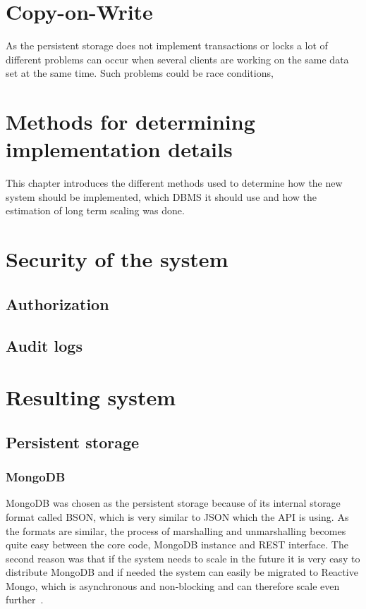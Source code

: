 \documentclass[a4paper,12pt]{article}
\begin{document}
\newpage 
\section{Copy-on-Write}
As the persistent storage does not implement transactions or locks a lot of different problems can occur when several 
clients are working on the same data set at the same time. Such problems could be race conditions, 

\section{Methods for determining\\implementation details}
This chapter introduces the different methods used to determine how the new system should be implemented, 
which DBMS it should use and how the estimation of long term scaling was done.

\section{Security of the system}
\subsection{Authorization}
\subsection{Audit logs}


\section{Resulting system}
\subsection{Persistent storage}
\subsubsection{MongoDB}
MongoDB was chosen as the persistent storage because of its internal storage format called BSON, which is very similar to JSON 
which the API is using. As the formats are similar, the process of marshalling and unmarshalling becomes quite easy between 
the core code, MongoDB instance and REST interface. The second reason was that if the system needs to scale in the future it 
is very easy to distribute MongoDB and if needed the system can easily be migrated to Reactive Mongo, which is asynchronous and 
non-blocking and can therefore scale even further~\cite{REACTIVEMONGO}.
\end{document}
